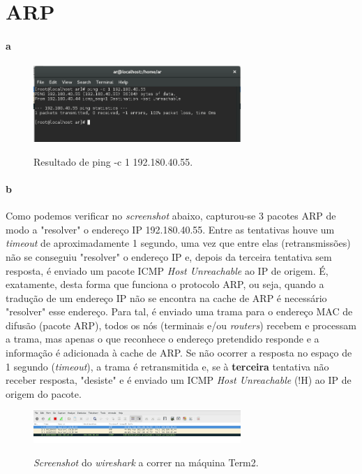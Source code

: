 \section{ARP}
\paragraph{a}

\begin{figure}[h]
\centering
\includegraphics[width=0.7\textwidth]{2_a_screenshot.png}
\label{fig:ping}
\caption{Resultado de \textsf{ping -c 1 192.180.40.55}.}
\end{figure}

\paragraph{b}
Como podemos verificar no \emph{screenshot} abaixo, capturou-se 3 pacotes ARP de modo a "resolver" o endereço IP 192.180.40.55. Entre as tentativas houve um \emph{timeout} de aproximadamente 1 segundo, uma vez que entre elas (retransmissões) não se conseguiu "resolver" o endereço IP e, depois da terceira tentativa sem resposta, é enviado um pacote ICMP \emph{Host Unreachable} ao IP de origem.
É, exatamente, desta forma que funciona o protocolo ARP, ou seja, quando a tradução de um endereço IP não se encontra na cache de ARP é necessário "resolver" esse endereço. Para tal, é enviado uma trama para o endereço MAC de difusão (pacote ARP), todos os nós (terminais e/ou \emph{routers}) recebem e processam a trama, mas apenas o que reconhece o endereço pretendido responde e a informação é adicionada à cache de ARP. Se não ocorrer a resposta no espaço de 1 segundo (\emph{timeout}), a trama é retransmitida e, se à \textbf{terceira} tentativa não receber resposta, "desiste" e é enviado um ICMP \emph{Host Unreachable} (!H) ao IP de origem do pacote.

\begin{figure}[h]
\centering
\includegraphics[width=0.7\textwidth]{2_a__screenshot.png}
\label{fig:wireshark}
\caption{\emph{Screenshot} do \emph{wireshark} a correr na máquina \textsf{Term2}.}
\end{figure}